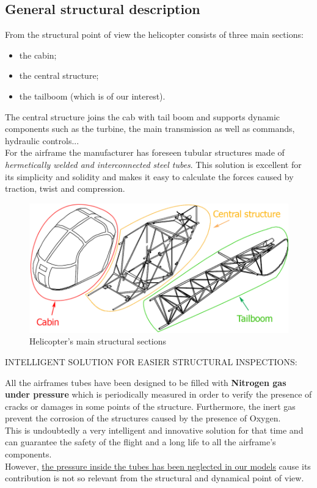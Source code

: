 \clearpage
\subsection*{General structural description }
\noindent From the structural point of view the helicopter consists of three main sections: 
\begin{itemize}
	\item the cabin;
	\item the central structure;
	\item the tailboom (which is of our interest).
\end{itemize}

\noindent The central structure joins the cab with tail boom and supports dynamic components such as the turbine, the main transmission as well as commands, hydraulic controls... \\
For the airframe the manufacturer has foreseen tubular structures made of \emph{hermetically welded and interconnected steel tubes}. This solution is excellent for its simplicity and solidity and makes it easy to calculate the forces caused by traction, twist and compression. \\

\medskip
\begin{figure}[h]
	\begin{center}
		\centering  		 		
		\includegraphics[width=0.8\linewidth]{PICTURES/2_Lama_truss/PNG/structure_parts.png}
	\end{center}
	\caption {Helicopter's main structural sections}
\end{figure}
\vspace{0.5cm}


\noindent INTELLIGENT SOLUTION FOR EASIER STRUCTURAL INSPECTIONS: \

\smallskip
\noindent All the airframes tubes have been designed to be filled with \textbf{Nitrogen gas under pressure} which is periodically measured in order to verify the presence of cracks or damages in some points of the structure. Furthermore, the inert gas prevent the corrosion of the structures caused by the presence of Oxygen. \\
This is undoubtedly a very intelligent and innovative solution for that time and can guarantee the safety of the flight and a long life to all the  airframe's components. \\
However, \underline{the pressure inside the tubes has been neglected in our models} cause its contribution is not so relevant from the structural and dynamical point of view.




